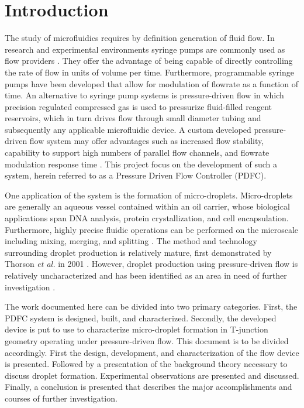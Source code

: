 \chapter{Introduction}

The study of microfluidics requires by definition generation of fluid flow. In research and experimental environments syringe pumps are commonly used as flow providers \cite{Christopher2008}. They offer the advantage of being capable of directly controlling the rate of flow in units of volume per time. Furthermore, programmable syringe pumps have been developed that allow for modulation of flowrate as a function of time. An alternative to syringe pump systems is pressure-driven flow in which precision regulated compressed gas is used to pressurize fluid-filled reagent reservoirs, which in turn drives flow through small diameter tubing and subsequently any applicable microfluidic device. A custom developed pressure-driven flow system may offer advantages such as increased flow stability, capability to support high numbers of parallel flow channels, and flowrate modulation response time \cite{Bong2011, Lim2015}. This project focus on the development of such a system, herein referred to as a Pressure Driven Flow Controller (PDFC). 

One application of the system is the formation of micro-droplets. Micro-droplets are generally an aqueous vessel contained within an oil carrier, whose biological applications span DNA analysis, protein crystallization, and cell encapsulation. Furthermore, highly precise fluidic operations can be performed on the microscale including mixing, merging, and splitting \cite{Cristini2004}. The method and technology surrounding droplet production is relatively mature, first demonstrated by Thorson \emph{et al.} in 2001 \cite{Thorsen2001}. However, droplet production using pressure-driven flow is relatively uncharacterized and has been identified as an area in need of further investigation \cite{Christopher2008}.

The work documented here can be divided into two primary categories. First, the PDFC system is designed, built, and characterized. Secondly, the developed device is put to use to characterize micro-droplet formation in T-junction geometry operating under pressure-driven flow. This document is to be divided accordingly. First the design, development, and characterization of the flow device is presented. Followed by a presentation of the background theory necessary to discuss droplet formation. Experimental observations are presented and discussed. Finally, a conclusion is presented that describes the major accomplishments and courses of further investigation.
